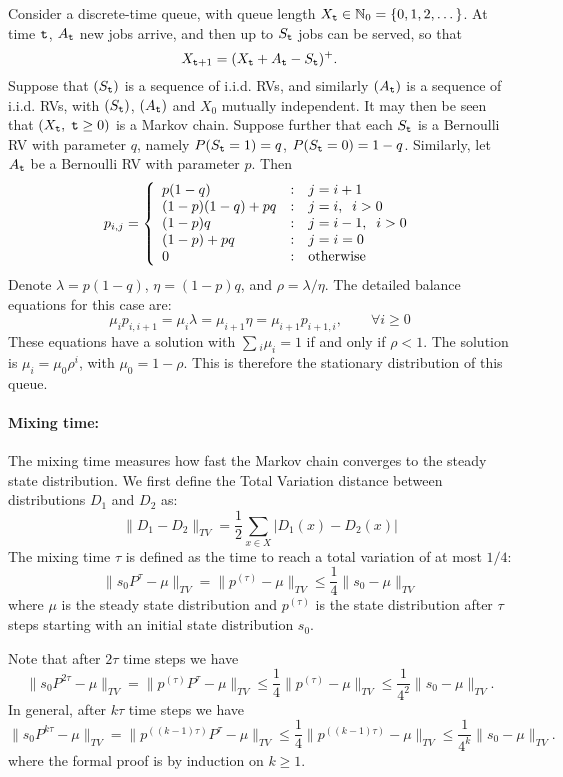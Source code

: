 \begin{example} Consider a discrete-time queue, with queue length $X_{\tt t}\in \mathbb{N}_0=\{0,1,2,\dots\}$. At time  ${\tt t}$, ${A_{\tt t}}$ new jobs arrive, and then up to ${S_{\tt t}}$ jobs can be served, so that
\[{X_{{\tt t} +1}} = {({X_{\tt t}} + {A_{\tt t}} - {S_{\tt t}})^ + }.\]
Suppose that $({S_{\tt t}})$ is a sequence of i.i.d. RVs, and
similarly $({A_{\tt t}})$ is a sequence of i.i.d. RVs, with
$({S_{\tt t}})$, $({A_{\tt t}})$ and ${X_0}$ mutually independent. It
may then be seen that $({X_{\tt t}},\;{\tt t} \ge 0)$ is a Markov chain.
Suppose further that each ${S_{\tt t}}$ is a Bernoulli RV with
parameter $q$, namely $P({S_{\tt t}} = 1) = q$, $P({S_{\tt t}} = 0) =
1 - q$. Similarly, let ${A_{\tt t}}$ be a Bernoulli RV with parameter
$p$. Then
\[{p_{i,j}} = \left\{ {\begin{array}{*{20}{l}}
{p(1 - q)}&:&{j = i + 1}\\
{(1 - p)(1 - q) + pq}&:&{j = i,\;\;i > 0}\\
{(1 - p)q}&:&{j = i - 1,\;\;i > 0}\\
{(1 - p) + pq}&:&{j = i = 0}\\
0&:&{{\rm{otherwise}}}
\end{array}} \right.\]
 Denote $\lambda  = p(1 - q)$, $\eta  = (1 - p)q$, and $\rho  = \lambda /\eta $.   The detailed balance equations for this case are:
\[
\mu_i p_{i,i+1}={\mu _i}\lambda  = {\mu _{i + 1}}\eta=\mu_{i+1}p_{i+1,i} ,\quad \quad \forall i \ge 0\]
These equations have a solution with $\sum {_i{\mu _i} = 1}$ if and
only if $\rho  < 1$. The solution is ${\mu _i} = {\mu _0}{\rho ^i}$,
with ${\mu _0} = 1 - \rho $. This is therefore the stationary
distribution of this queue.
\end{example}


\paragraph{Mixing time:} %
The mixing time measures how fast the Markov chain converges to the steady state distribution. We first define the Total Variation distance between distributions $D_1$ and $D_2$ as:
\[
\|D_1-D_2\|_{TV}=\frac{1}{2}\sum_{x\in X} | D_1 (x) - D_2(x) |
\]
The mixing time $\tau$ is defined as the time to reach a total variation of at most $1/4$:
\[
\|s_0 P^{\tau}-\mu\|_{TV}=\|p^{(\tau)}-\mu\|_{TV}\leq \frac{1}{4}\| s_0-\mu\|_{TV}
\]
where $\mu$ is the steady state distribution and $p^{(\tau)}$ is the state distribution after $\tau$ steps starting with an initial state distribution $s_0$.

Note that after $2\tau$ time steps we have 
\[
\|s_0 P^{2\tau}-\mu\|_{TV}=\|p^{(\tau)}P^{\tau}-\mu\|_{TV}\leq \frac{1}{4}\| p^{(\tau)}-\mu\|_{TV}\leq \frac{1}{4^2}\| s_0-\mu\|_{TV}.
\]
In general, after $k\tau$ time steps we have 
\[
\|s_0 P^{k\tau}-\mu\|_{TV}=\|p^{((k-1)\tau)}P^{\tau}-\mu\|_{TV}\leq \frac{1}{4}\| p^{((k-1)\tau)}-\mu\|_{TV}\leq \frac{1}{4^k}\| s_0-\mu\|_{TV}.
\]
where the formal proof is by induction on $k\geq1$.

